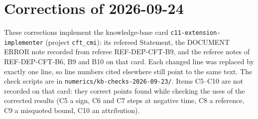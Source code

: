 \documentclass[11pt]{article}
\begin{document}
\section{Corrections of 2026-09-24}\label{corr0924:sec}
\sloppy
These corrections implement the knowledge-base card \texttt{c11-extension-implementer} (project
\texttt{cft\_cmi}): its refereed Statement, the DOCUMENT ERROR note recorded from referee
REF-DEP-CFT-B9, and the referee notes of REF-DEP-CFT-B6, B9 and B10 on that card.  Each changed line
was replaced by exactly one line, so line numbers cited elsewhere still point to the same text.  The
check scripts are in \texttt{numerics/kb-checks-2026-09-23/}.  Items C5--C10 are not recorded on that
card: they correct points found while checking the uses of the corrected results (C5 a sign, C6 and
C7 steps at negative time, C8 a reference, C9 a misquoted bound, C10 an attribution).
\end{document}
